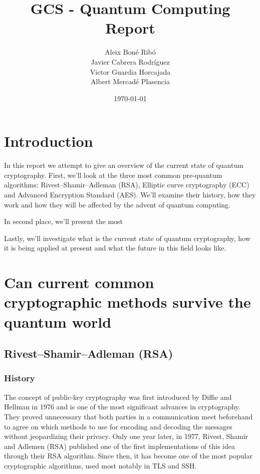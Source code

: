 
\usepackage{dsfont}





\title{
    GCS - Quantum Computing Report
}
\author{
Aleix Boné Ribó\\
Javier Cabrera Rodríguez\\
Victor Guardia Horcajada\\
Albert Mercadé Plasencia
}
\date{
    \today
}





\tableofcontents

\setlength{\parskip}{1em}

\pagebreak
\section{Introduction}%
\label{sec:introduction}

In this report we attempt to give an overview of the current state of quantum
cryptography. First, we’ll look at the three most common pre-quantum algorithms:
Rivest–Shamir–Adleman (RSA), Elliptic curve cryptography (ECC) and Advanced
Encryption Standard (AES). We’ll examine their history, how they work and how
they will be affected by the advent of quantum computing.

In second place, we’ll present the most %

Lastly, we’ll investigate what is the current state of quantum cryptography, how
it is being applied at present and what the future in this field looks like.


\section{Can current common cryptographic methods survive the quantum world}

\subsection{Rivest–Shamir–Adleman (RSA)}

\subsubsection{History}

The concept of public-key cryptography was first introduced by Diffie and
Hellman in 1976 and is one of the most significant advances in cryptography.
They proved unnecessary that both parties in a communication meet beforehand to
agree on which methods to use for encoding and decoding the messages without
jeopardizing their privacy. Only one year later, in 1977, Rivest, Shamir and
Adlemen (RSA) published one of the first implementations of this idea through
their RSA algorithm. Since then, it has become one of the most popular
cryptographic algorithms, used most notably in TLS and SSH.

